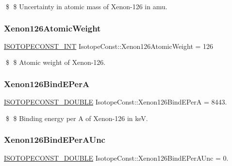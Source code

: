 \$ \$ Uncertainty in atomic mass of Xenon-\/126 in amu. \mbox{\label{group___isotope_const-_xenon-_xe126_ga39c153406cdf7105ffabd70607b1d2e3}} 
\subsubsection{\texorpdfstring{Xenon126\+Atomic\+Weight}{Xenon126AtomicWeight}}
{\footnotesize\ttfamily \mbox{\hyperlink{group___isotope_const-_macros_ga5f18360b3e99483a35c32d789e62621c}{I\+S\+O\+T\+O\+P\+E\+C\+O\+N\+S\+T\+\_\+\+I\+NT}} Isotope\+Const\+::\+Xenon126\+Atomic\+Weight = 126}

\$ \$ Atomic weight of Xenon-\/126. \mbox{\label{group___isotope_const-_xenon-_xe126_gaacc1a1920cedd1ea4c03855d9d2c56df}} 
\subsubsection{\texorpdfstring{Xenon126\+Bind\+E\+PerA}{Xenon126BindEPerA}}
{\footnotesize\ttfamily \mbox{\hyperlink{group___isotope_const-_macros_ga8f45a7272ce02c0b4c65c44636ed719a}{I\+S\+O\+T\+O\+P\+E\+C\+O\+N\+S\+T\+\_\+\+D\+O\+U\+B\+LE}} Isotope\+Const\+::\+Xenon126\+Bind\+E\+PerA = 8443.}

\$ \$ Binding energy per A of Xenon-\/126 in keV. \mbox{\label{group___isotope_const-_xenon-_xe126_gabf532b663d1284c4366bc107ec11b6ea}} 
\subsubsection{\texorpdfstring{Xenon126\+Bind\+E\+Per\+A\+Unc}{Xenon126BindEPerAUnc}}
{\footnotesize\ttfamily \mbox{\hyperlink{group___isotope_const-_macros_ga8f45a7272ce02c0b4c65c44636ed719a}{I\+S\+O\+T\+O\+P\+E\+C\+O\+N\+S\+T\+\_\+\+D\+O\+U\+B\+LE}} Isotope\+Const\+::\+Xenon126\+Bind\+E\+Per\+A\+Unc = 0.}

